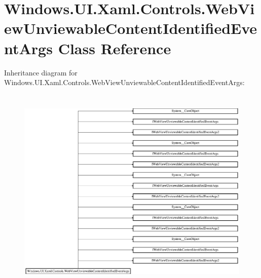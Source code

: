 \hypertarget{class_windows_1_1_u_i_1_1_xaml_1_1_controls_1_1_web_view_unviewable_content_identified_event_args}{}\section{Windows.\+U\+I.\+Xaml.\+Controls.\+Web\+View\+Unviewable\+Content\+Identified\+Event\+Args Class Reference}
\label{class_windows_1_1_u_i_1_1_xaml_1_1_controls_1_1_web_view_unviewable_content_identified_event_args}
Inheritance diagram for Windows.\+U\+I.\+Xaml.\+Controls.\+Web\+View\+Unviewable\+Content\+Identified\+Event\+Args\+:\begin{figure}[H]
\begin{center}
\leavevmode
\includegraphics[height=10.112867cm]{class_windows_1_1_u_i_1_1_xaml_1_1_controls_1_1_web_view_unviewable_content_identified_event_args}
\end{center}
\end{figure}
